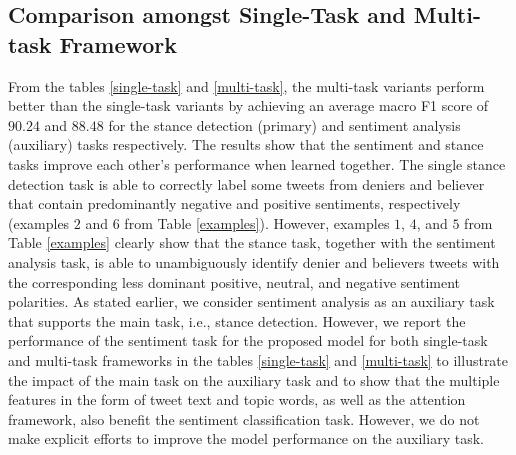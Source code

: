 \documentclass[letterpaper]{article}
\begin{document}
\subsection{Comparison amongst Single-Task and Multi-task Framework}
\par \noindent From the tables \ref{single-task} and \ref{multi-task}, the multi-task variants perform better than the single-task variants by achieving an average macro F1 score of $90.24$ and $88.48$ for the stance detection (primary) and sentiment analysis (auxiliary) tasks respectively. The results show that the sentiment and stance tasks improve each other's performance when learned together. The single stance detection task is able to correctly label some tweets from deniers and believer that contain predominantly negative and positive sentiments, respectively (examples $2$ and $6$ from Table \ref{examples}). However, examples $1$, $4$, and $5$ from Table \ref{examples} clearly show that the stance task, together with the sentiment analysis task, is able to unambiguously identify denier and believers tweets with the corresponding less dominant positive, neutral, and negative sentiment polarities. As stated earlier, we consider sentiment analysis as an auxiliary task that supports the main task, i.e., stance detection. However, we report the performance of the sentiment task for the proposed model for both single-task and multi-task frameworks in the tables \ref{single-task} and \ref{multi-task} to illustrate the impact of the main task on the auxiliary task and to show that the multiple features in the form of tweet text and topic words, as well as the attention framework, also benefit the sentiment classification task. However, we do not make explicit efforts to improve the model performance on the auxiliary task.
\end{document}
